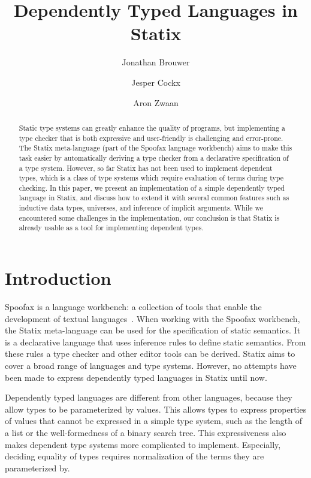 \documentclass[a4paper,UKenglish,cleveref, autoref, thm-restate]{oasics-v2021}
\title{Dependently Typed Languages in Statix}
\author{Jonathan Brouwer}{Delft University of Technology, The Netherlands \and \url{http://jonathanb.nl}}{j.t.brouwer@student.tudelft.nl}{https://orcid.org/0000-0002-2469-548X}{}
\author{Jesper Cockx}{Delft University of Technology, The Netherlands \and \url{http://jesper.sikanda.be}}{j.g.h.cockx@tudelft.nl}{https://orcid.org/0000-0003-3862-4073}{}
\author{Aron Zwaan}{Delft University of Technology, The Netherlands \and \url{http://aronzwaan.github.io}}{a.s.zwaan@tudelft.nl}{https://orcid.org/0000-0002-1818-4245}{}
\begin{document}
\maketitle

\begin{abstract}
Static type systems can greatly enhance the quality of programs, but implementing a type checker that is both expressive and user-friendly is challenging and error-prone. The Statix meta-language (part of the Spoofax language workbench) aims to make this task easier by automatically deriving a type checker from a declarative specification of a type system. However, so far Statix has not been used to implement dependent types, which is a class of type systems which require evaluation of terms during type checking. In this paper, we present an implementation of a simple dependently typed language in Statix, and discuss how to extend it with several common features such as inductive data types, universes, and inference of implicit arguments. While we encountered some challenges in the implementation, our conclusion is that Statix is already usable as a tool for implementing dependent types.
\end{abstract}

\section{Introduction}

Spoofax is a language workbench: \label{key}a collection of tools that enable the development of textual languages~\cite{spoofax}. When working with the Spoofax workbench, the Statix meta-language can be used for the specification of static semantics. It is a declarative language that uses inference rules to define static semantics. From these rules a type checker and other editor tools can be derived. Statix aims to cover a broad range of languages and type systems. However, no attempts have been made to express dependently typed languages in Statix until now. 

Dependently typed languages are different from other languages, because they allow types to be parameterized by values. This allows types to express properties of values that cannot be expressed in a simple type system, such as the length of a list or the well-formedness of a binary search tree. This expressiveness also makes dependent type systems more complicated to implement. Especially, deciding equality of types requires normalization of the terms they are parameterized by. 
\end{document}
